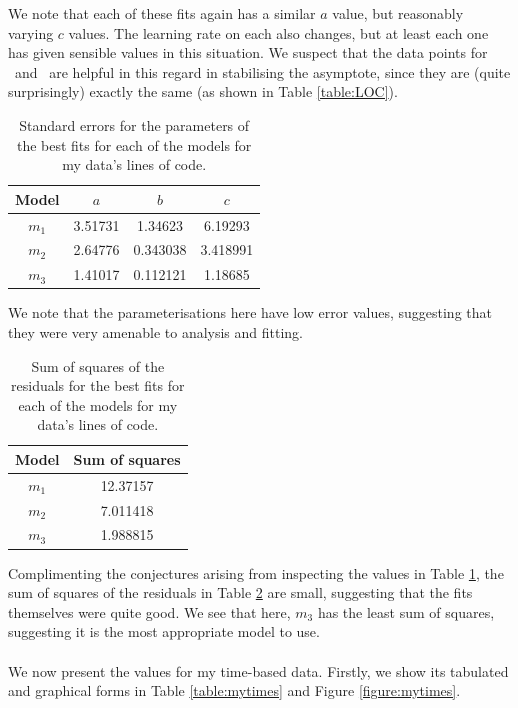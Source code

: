 We note that each of these fits again has a similar $a$ value, but 
reasonably varying $c$ values.
The learning rate on each also changes, but at least each one has given sensible
values in this situation.
We suspect that the data points for \AT\ and \ATh\ are helpful in this regard in
stabilising the asymptote, since they are (quite surprisingly) exactly the same
(as shown in Table \ref{table:LOC}).

\begin{table}[ht!]
\centering
\begin{tabular}{|c|c|c|c|}
\hline
{\bf Model} &  $a$ & $b$ & $c$ \\
\hline
$m_1$ & 3.51731 & 1.34623 & 6.19293 \\
\hline
$m_2$ & 2.64776 & 0.343038 & 3.418991\\
\hline
$m_3$ & 1.41017 & 0.112121 & 1.18685 \\
\hline
\end{tabular}
\caption{Standard errors for the parameters of the best fits for each of the
  models for my data's lines of code.}
\label{table:LOC:abc:error}
\end{table}

We note that the parameterisations here have low error values, suggesting that
they were very amenable to analysis and fitting.

\begin{table}[ht!]
\centering
\begin{tabular}{|c|c|}
\hline
{\bf Model} & Sum of squares \\
\hline
$m_1$ & 12.37157\\
\hline
$m_2$ & 7.011418\\
\hline
$m_3$ & 1.988815\\
\hline
\end{tabular}
\caption{Sum of squares of the residuals for the best fits for each of the
  models for my data's lines of code.}
\label{table:LOC:abc:sumsquares}
\end{table}

Complimenting the conjectures arising from inspecting the values in Table
\ref{table:LOC:abc:error}, the sum of squares of the residuals in Table
\ref{table:LOC:abc:sumsquares} are small, suggesting that the fits themselves
were quite good.
We see that here, $m_3$ has the least sum of squares, suggesting it is the most
appropriate model to use.\\
\\
We now present the values for my time-based data.
Firstly, we show its tabulated and graphical forms in Table \ref{table:mytimes}
and Figure \ref{figure:mytimes}.

